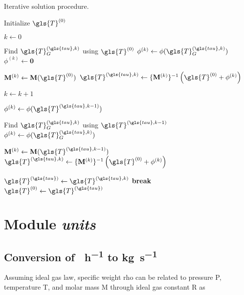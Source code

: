 \documentclass[12pt]{article}%
\begin{document}
\begin{algorithm}[ht!]
\caption{\label{alg:heat-1d-solution}Iterative solution procedure.}
\begin{algorithmic}
	\State Initialize $\gls{T}^{(0)}$
	
		\State $k \gets 0$
		
			\State Find $\gls{T}^{(\gls{tau},k)}_{G}$ using $\gls{T}^{(0)}$
			\State $\phi^{(k)} \gets \phi(\gls{T}^{(\gls{tau},k)}_{G})$
		\Else
			\State $\phi^{(k)} \gets \mathbf{0}$
		\EndIf
		
		\State $\mathbf{M}^{(k)} \gets \mathbf{M}(\gls{T}^{(0)})$
		\State $\gls{T}^{(\gls{tau}, k)} \gets \{\mathbf{M}^{(k)}\}^{-1}\left(\gls{T}^{(0)} + \phi^{(k)}\right)$
			
			\State $k \gets k + 1$
			
			\State $\phi^{(k)} \gets \phi(\gls{T}^{(\gls{tau}, k-1)})$
		
				\State Find $\gls{T}^{(\gls{tau},k)}_{G}$ using $\gls{T}^{(\gls{tau}, k-1)}$
				\State $\phi^{(k)} \gets \phi(\gls{T}^{(\gls{tau},k)}_{G})$
			\EndIf
	
			\State $\mathbf{M}^{(k)} \gets \mathbf{M}(\gls{T}^{(\gls{tau}, k-1)})$
			\State $\gls{T}^{(\gls{tau}, k)} \gets \{\mathbf{M}^{(k)}\}^{-1}\left(\gls{T}^{(0)} + \phi^{(k)}\right)$
			
				\State $\gls{T}^{(\gls{tau})} \gets \gls{T}^{(\gls{tau}, k)}$
				\State \textbf{break}
			\EndIf
		\EndWhile
		\State $\gls{T}^{(0)} \gets \gls{T}^{(\gls{tau})}$
	\EndFor
\end{algorithmic}
\end{algorithm}

\section{Module \emph{units}}

\subsection{Conversion of \si{\Ncm\per\hour} to \si{\kilo\gram\per\second}}

Assuming ideal gas law, specific weight \gls{rho} can be related to pressure \gls{P}, temperature \gls{T}, and molar mass \gls{M} through ideal gas constant \gls{R} as 
\end{document}
